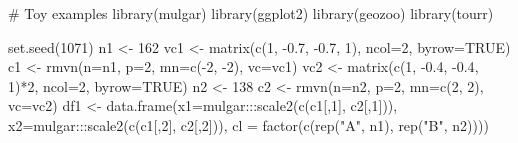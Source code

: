 \documentclass[
  letterpaper,
]{book}
\newenvironment{Shaded}{\begin{snugshade}}{\end{snugshade}}
\newcommand{\AttributeTok}[1]{\textcolor[rgb]{0.40,0.45,0.13}{#1}}
\newcommand{\CommentTok}[1]{\textcolor[rgb]{0.37,0.37,0.37}{#1}}
\newcommand{\ConstantTok}[1]{\textcolor[rgb]{0.56,0.35,0.01}{#1}}
\newcommand{\DecValTok}[1]{\textcolor[rgb]{0.68,0.00,0.00}{#1}}
\newcommand{\FloatTok}[1]{\textcolor[rgb]{0.68,0.00,0.00}{#1}}
\newcommand{\FunctionTok}[1]{\textcolor[rgb]{0.28,0.35,0.67}{#1}}
\newcommand{\NormalTok}[1]{\textcolor[rgb]{0.00,0.23,0.31}{#1}}
\newcommand{\OtherTok}[1]{\textcolor[rgb]{0.00,0.23,0.31}{#1}}
\newcommand{\SpecialCharTok}[1]{\textcolor[rgb]{0.37,0.37,0.37}{#1}}
\newcommand{\StringTok}[1]{\textcolor[rgb]{0.13,0.47,0.30}{#1}}
\begin{document}
\begin{Shaded}
\begin{Highlighting}[]
\CommentTok{\# Toy examples}
\FunctionTok{library}\NormalTok{(mulgar)}
\FunctionTok{library}\NormalTok{(ggplot2)}
\FunctionTok{library}\NormalTok{(geozoo)}
\FunctionTok{library}\NormalTok{(tourr)}

\FunctionTok{set.seed}\NormalTok{(}\DecValTok{1071}\NormalTok{)}
\NormalTok{n1 }\OtherTok{\textless{}{-}} \DecValTok{162}
\NormalTok{vc1 }\OtherTok{\textless{}{-}} \FunctionTok{matrix}\NormalTok{(}\FunctionTok{c}\NormalTok{(}\DecValTok{1}\NormalTok{, }\SpecialCharTok{{-}}\FloatTok{0.7}\NormalTok{, }\SpecialCharTok{{-}}\FloatTok{0.7}\NormalTok{, }\DecValTok{1}\NormalTok{), }\AttributeTok{ncol=}\DecValTok{2}\NormalTok{, }\AttributeTok{byrow=}\ConstantTok{TRUE}\NormalTok{)}
\NormalTok{c1 }\OtherTok{\textless{}{-}} \FunctionTok{rmvn}\NormalTok{(}\AttributeTok{n=}\NormalTok{n1, }\AttributeTok{p=}\DecValTok{2}\NormalTok{, }\AttributeTok{mn=}\FunctionTok{c}\NormalTok{(}\SpecialCharTok{{-}}\DecValTok{2}\NormalTok{, }\SpecialCharTok{{-}}\DecValTok{2}\NormalTok{), }\AttributeTok{vc=}\NormalTok{vc1)}
\NormalTok{vc2 }\OtherTok{\textless{}{-}} \FunctionTok{matrix}\NormalTok{(}\FunctionTok{c}\NormalTok{(}\DecValTok{1}\NormalTok{, }\SpecialCharTok{{-}}\FloatTok{0.4}\NormalTok{, }\SpecialCharTok{{-}}\FloatTok{0.4}\NormalTok{, }\DecValTok{1}\NormalTok{)}\SpecialCharTok{*}\DecValTok{2}\NormalTok{, }\AttributeTok{ncol=}\DecValTok{2}\NormalTok{, }\AttributeTok{byrow=}\ConstantTok{TRUE}\NormalTok{)}
\NormalTok{n2 }\OtherTok{\textless{}{-}} \DecValTok{138}
\NormalTok{c2 }\OtherTok{\textless{}{-}} \FunctionTok{rmvn}\NormalTok{(}\AttributeTok{n=}\NormalTok{n2, }\AttributeTok{p=}\DecValTok{2}\NormalTok{, }\AttributeTok{mn=}\FunctionTok{c}\NormalTok{(}\DecValTok{2}\NormalTok{, }\DecValTok{2}\NormalTok{), }\AttributeTok{vc=}\NormalTok{vc2)}
\NormalTok{df1 }\OtherTok{\textless{}{-}} \FunctionTok{data.frame}\NormalTok{(}\AttributeTok{x1=}\NormalTok{mulgar}\SpecialCharTok{:::}\FunctionTok{scale2}\NormalTok{(}\FunctionTok{c}\NormalTok{(c1[,}\DecValTok{1}\NormalTok{], c2[,}\DecValTok{1}\NormalTok{])), }
                 \AttributeTok{x2=}\NormalTok{mulgar}\SpecialCharTok{:::}\FunctionTok{scale2}\NormalTok{(}\FunctionTok{c}\NormalTok{(c1[,}\DecValTok{2}\NormalTok{], c2[,}\DecValTok{2}\NormalTok{])), }
                 \AttributeTok{cl =} \FunctionTok{factor}\NormalTok{(}\FunctionTok{c}\NormalTok{(}\FunctionTok{rep}\NormalTok{(}\StringTok{"A"}\NormalTok{, n1), }
                               \FunctionTok{rep}\NormalTok{(}\StringTok{"B"}\NormalTok{, n2))))}

\end{Highlighting}
\end{Shaded}
\end{document}
